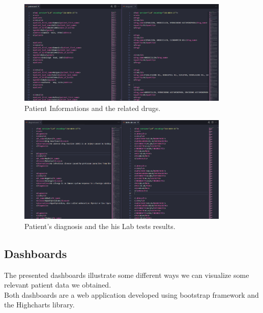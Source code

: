 \begin{figure}[h!]
    \center
    \includegraphics[width=0.90\textwidth]{images/chapter4/result1.PNG}
    \caption{Patient Informations and the related drugs.}
    \label{fig:resultone}
\end{figure}
\begin{figure}[h!]
    \center
    \includegraphics[width=0.90\textwidth]{images/chapter4/result2.PNG}
    \caption{Patient's diagnosis and the his Lab tests results.}
    \label{fig:resulttwo}
\end{figure}

\subsection{Dashboards}
The presented dashboards illustrate some different ways we can visualize some relevant patient data we obtained.\\
Both dashboards are a web application developed using bootstrap\cite{IntroductionBootstrapV5}  framework and the Highcharts  library.

